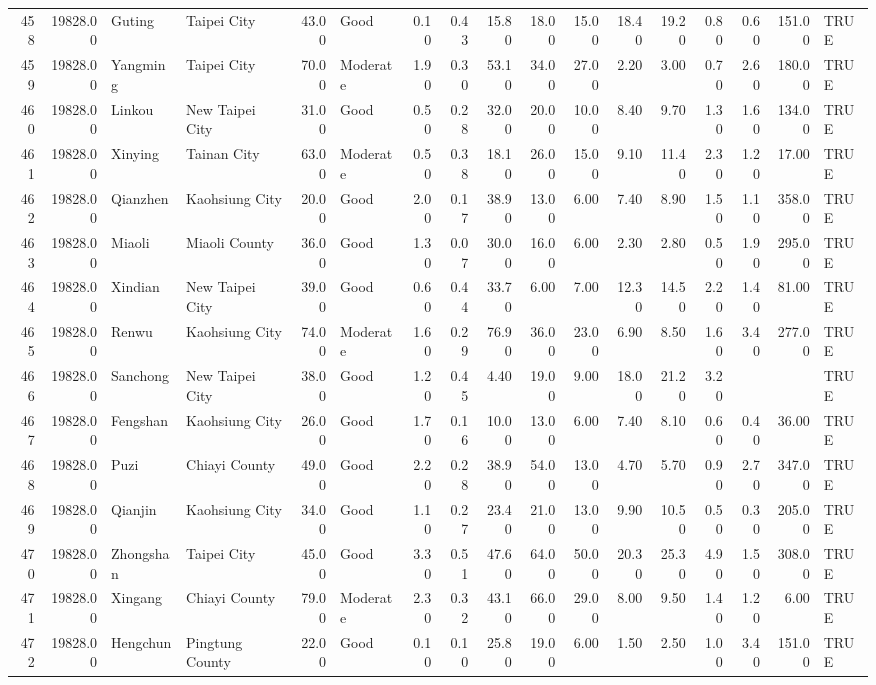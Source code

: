 \begin{table}[ht]
\begin{tabular}{rrllrlrrrrrrrrrrl}
  458 & 19828.00 & Guting & Taipei City & 43.00 & Good & 0.10 & 0.43 & 15.80 & 18.00 & 15.00 & 18.40 & 19.20 & 0.80 & 0.60 & 151.00 & TRUE \\ 
  459 & 19828.00 & Yangming & Taipei City & 70.00 & Moderate & 1.90 & 0.30 & 53.10 & 34.00 & 27.00 & 2.20 & 3.00 & 0.70 & 2.60 & 180.00 & TRUE \\ 
  460 & 19828.00 & Linkou & New Taipei City & 31.00 & Good & 0.50 & 0.28 & 32.00 & 20.00 & 10.00 & 8.40 & 9.70 & 1.30 & 1.60 & 134.00 & TRUE \\ 
  461 & 19828.00 & Xinying & Tainan City & 63.00 & Moderate & 0.50 & 0.38 & 18.10 & 26.00 & 15.00 & 9.10 & 11.40 & 2.30 & 1.20 & 17.00 & TRUE \\ 
  462 & 19828.00 & Qianzhen & Kaohsiung City & 20.00 & Good & 2.00 & 0.17 & 38.90 & 13.00 & 6.00 & 7.40 & 8.90 & 1.50 & 1.10 & 358.00 & TRUE \\ 
  463 & 19828.00 & Miaoli & Miaoli County & 36.00 & Good & 1.30 & 0.07 & 30.00 & 16.00 & 6.00 & 2.30 & 2.80 & 0.50 & 1.90 & 295.00 & TRUE \\ 
  464 & 19828.00 & Xindian & New Taipei City & 39.00 & Good & 0.60 & 0.44 & 33.70 & 6.00 & 7.00 & 12.30 & 14.50 & 2.20 & 1.40 & 81.00 & TRUE \\ 
  465 & 19828.00 & Renwu & Kaohsiung City & 74.00 & Moderate & 1.60 & 0.29 & 76.90 & 36.00 & 23.00 & 6.90 & 8.50 & 1.60 & 3.40 & 277.00 & TRUE \\ 
  466 & 19828.00 & Sanchong & New Taipei City & 38.00 & Good & 1.20 & 0.45 & 4.40 & 19.00 & 9.00 & 18.00 & 21.20 & 3.20 &  &  & TRUE \\ 
  467 & 19828.00 & Fengshan & Kaohsiung City & 26.00 & Good & 1.70 & 0.16 & 10.00 & 13.00 & 6.00 & 7.40 & 8.10 & 0.60 & 0.40 & 36.00 & TRUE \\ 
  468 & 19828.00 & Puzi & Chiayi County & 49.00 & Good & 2.20 & 0.28 & 38.90 & 54.00 & 13.00 & 4.70 & 5.70 & 0.90 & 2.70 & 347.00 & TRUE \\ 
  469 & 19828.00 & Qianjin & Kaohsiung City & 34.00 & Good & 1.10 & 0.27 & 23.40 & 21.00 & 13.00 & 9.90 & 10.50 & 0.50 & 0.30 & 205.00 & TRUE \\ 
  470 & 19828.00 & Zhongshan & Taipei City & 45.00 & Good & 3.30 & 0.51 & 47.60 & 64.00 & 50.00 & 20.30 & 25.30 & 4.90 & 1.50 & 308.00 & TRUE \\ 
  471 & 19828.00 & Xingang & Chiayi County & 79.00 & Moderate & 2.30 & 0.32 & 43.10 & 66.00 & 29.00 & 8.00 & 9.50 & 1.40 & 1.20 & 6.00 & TRUE \\ 
  472 & 19828.00 & Hengchun & Pingtung County & 22.00 & Good & 0.10 & 0.10 & 25.80 & 19.00 & 6.00 & 1.50 & 2.50 & 1.00 & 3.40 & 151.00 & TRUE \\ 

\end{tabular}
\end{table}
